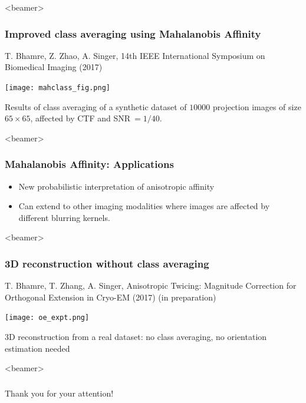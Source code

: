 \documentclass{beamer}
\begin{document}
\begin{frame}<beamer>
\frametitle{Improved class averaging using Mahalanobis Affinity}
{\tiny T. Bhamre, Z. Zhao, A. Singer, 14th IEEE International Symposium on Biomedical Imaging (2017)}
\begin{center}
\texttt{[image: mahclass\_fig.png]}
\end{center}
Results of class averaging of a synthetic dataset of $10000$ projection images of size $65 \times 65$, affected by CTF and SNR$\ =1/40$. 
\end{frame}


\begin{frame}<beamer>
\frametitle{Mahalanobis Affinity: Applications}
\begin{itemize}
\item New probabilistic interpretation of anisotropic affinity
\item Can extend to other imaging modalities where images are affected by different blurring kernels.
\end{itemize}
\end{frame}

\begin{frame}<beamer>
\frametitle{3D reconstruction without class averaging}
 T. Bhamre, T. Zhang, A. Singer, Anisotropic Twicing: Magnitude Correction for Orthogonal Extension in Cryo-EM (2017) (in preparation)
\begin{center}
\texttt{[image: oe\_expt.png]}
\end{center}
3D reconstruction from a real dataset: no class averaging, no orientation estimation needed
\end{frame}

\begin{frame}<beamer>
\frametitle{}
Thank you for your attention!
\end{frame}
\end{document}
